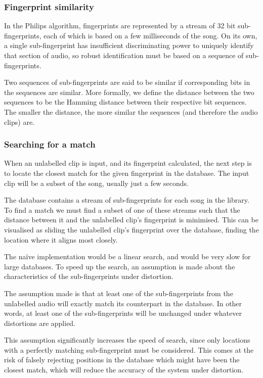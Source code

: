 \documentclass[12pt,a4paper,twoside,openright]{report}
\begin{document}
\subsubsection{Fingerprint similarity}

In the Philips algorithm, fingerprints are represented by a stream of 32 bit sub-fingerprints, each of which is based on a few milliseconds of the song. On its own, a single sub-fingerprint has insufficient discriminating power to uniquely identify that section of audio, so robust identification must be based on a sequence of sub-fingerprints.

Two sequences of sub-fingerprints are said to be similar if corresponding bits in the sequences are similar. More formally, we define the distance between the two sequences to be the Hamming distance between their respective bit sequences. The smaller the distance, the more similar the sequences (and therefore the audio clips) are.


\subsubsection{Searching for a match}

When an unlabelled clip is input, and its fingerprint calculated, the next step is to locate the closest match for the given fingerprint in the database. The input clip will be a subset of the song, usually just a few seconds.

The database contains a stream of sub-fingerprints for each song in the library. To find a match we must find a subset of one of these streams such that the distance between it and the unlabelled clip's fingerprint is minimised. This can be visualised as sliding the unlabelled clip's fingerprint over the database, finding the location where it aligns most closely.

The na\"ive implementation would be a linear search, and would be very slow for large databases. To speed up the search, an assumption is made about the characteristics of the sub-fingerprints under distortion. 

The assumption made is that at least one of the sub-fingerprints from the unlabelled audio will exactly match its counterpart in the database. In other words, at least one of the sub-fingerprints will be unchanged under whatever distortions are applied.

This assumption significantly increases the speed of search, since only locations with a perfectly matching sub-fingerprint must be considered. This comes at the risk of falsely rejecting positions in the database which might have been the closest match, which will reduce the accuracy of the system under distortion.
\end{document}
